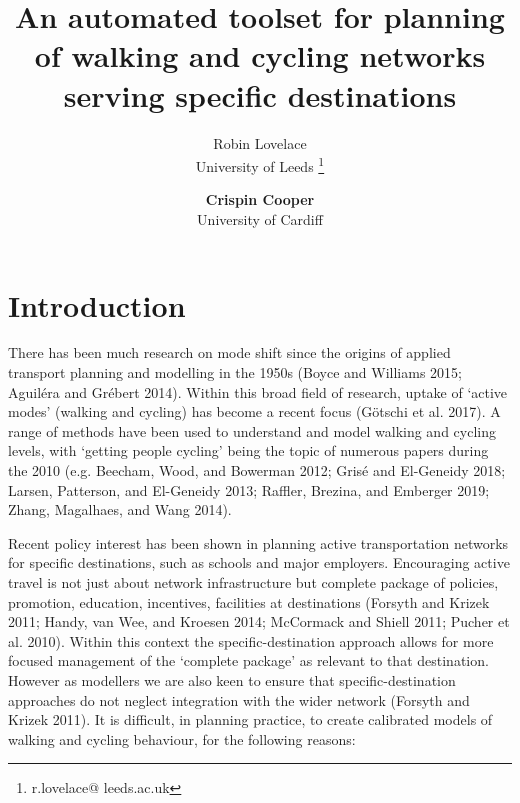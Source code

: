 \documentclass[galley]{jtlu-article-2col}
\title{An automated toolset for planning of walking and cycling networks serving specific destinations}
\author{{\semibfsf Robin Lovelace  } \\University of Leeds  \thanks{r.lovelace@ leeds.ac.uk}
  \and {\bfseries Crispin Cooper} \\University of Cardiff
}%
\date{} %
\begin{document}
\saythanks

\onecolumn

\hypertarget{introduction}{%
\section{Introduction}\label{introduction}}

There has been much research on mode shift since the origins of applied transport planning and modelling in the 1950s (Boyce and Williams 2015; Aguiléra and Grébert 2014). Within this broad field of research, uptake of `active modes' (walking and cycling) has become a recent focus (Götschi et al. 2017). A range of methods have been used to understand and model walking and cycling levels, with `getting people cycling' being the topic of numerous papers during the 2010 (e.g. Beecham, Wood, and Bowerman 2012; Grisé and El-Geneidy 2018; Larsen, Patterson, and El-Geneidy 2013; Raffler, Brezina, and Emberger 2019; Zhang, Magalhaes, and Wang 2014).

Recent policy interest has been shown in planning active transportation networks for specific destinations, such as schools and major employers.
Encouraging active travel is not just about network infrastructure but complete package of policies, promotion, education, incentives, facilities at destinations (Forsyth and Krizek 2011; Handy, van Wee, and Kroesen 2014; McCormack and Shiell 2011; Pucher et al. 2010).
Within this context the specific-destination approach allows for more focused management of the `complete package' as relevant to that destination.
However as modellers we are also keen to ensure that specific-destination approaches do not neglect integration with the wider network (Forsyth and Krizek 2011).
It is difficult, in planning practice, to create calibrated models of walking and cycling behaviour, for the following reasons:
\end{document}
